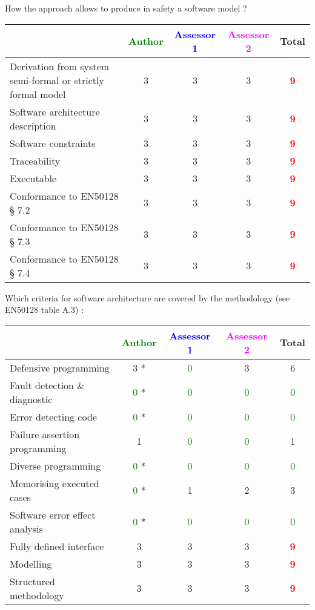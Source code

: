 How the approach allows to  produce in safety a software model ?

\begin{tabular}{|l | c | c | c | c|}
\hline
& \textcolor{green}{Author} & \textcolor{blue}{Assessor 1} & \textcolor{magenta}{Assessor 2} & Total \\
\hline
Derivation from system semi-formal or strictly formal model  &
3 & 3    &3 & \textcolor{red}{\textbf{9}} \\
\hline 
Software architecture description  & 3    & 3    &3 & \textcolor{red}{\textbf{9}} \\
\hline
Software constraints  & 3    & 3    &3 & \textcolor{red}{\textbf{9}} \\
\hline
Traceability  & 3    & 3    &3 & \textcolor{red}{\textbf{9}} \\
\hline
Executable  & 3    & 3    &3 & \textcolor{red}{\textbf{9}} \\
\hline
Conformance to EN50128 § 7.2  & 3    & 3    &3 & \textcolor{red}{\textbf{9}} \\
\hline
Conformance to EN50128 § 7.3  & 3    & 3    &3 & \textcolor{red}{\textbf{9}} \\
\hline
Conformance to EN50128 § 7.4  & 3   & 3    &3 & \textcolor{red}{\textbf{9}} \\
\hline
\end{tabular}

Which criteria for software architecture are covered by the methodology
(see EN50128 table A.3) :

\begin{tabular}{|l | c | c | c | c|}
\hline
& \textcolor{green}{Author} & \textcolor{blue}{Assessor 1} & \textcolor{magenta}{Assessor 2} & Total \\
\hline
Defensive programming  & 3   * & \textcolor{green}{0} &3 &  6 \\
\hline 
Fault detection \& diagnostic  & \textcolor{green}{0} * & \textcolor{green}{0} & \textcolor{green}{0}   & \textcolor{green}{0} \\
\hline
Error detecting code  & \textcolor{green}{0} * & \textcolor{green}{0} & \textcolor{green}{0}   & \textcolor{green}{0} \\
\hline
Failure assertion programming & 1    & \textcolor{green}{0} & \textcolor{green}{0}   & 1    \\
\hline
Diverse programming & \textcolor{green}{0} * & \textcolor{green}{0} & \textcolor{green}{0}   & \textcolor{green}{0} \\
\hline
Memorising executed cases & \textcolor{green}{0} * & 1    &2 & 3    \\
\hline
Software error effect analysis & \textcolor{green}{0} * & \textcolor{green}{0} & \textcolor{green}{0}   & \textcolor{green}{0} \\
\hline
Fully defined interface & 3    & 3    &3 & \textcolor{red}{\textbf{9}} \\
\hline
Modelling  & 3    & 3    &3 & \textcolor{red}{\textbf{9}} \\
\hline
Structured methodology & 3    & 3    &3 & \textcolor{red}{\textbf{9}} \\
\hline
\end{tabular}

